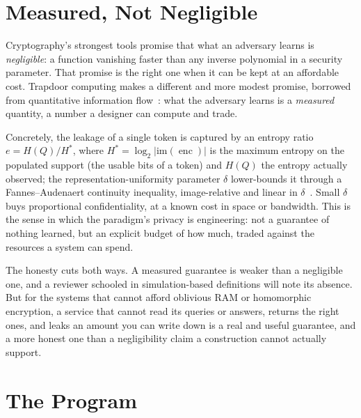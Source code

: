 \documentclass[11pt]{article}
\newcommand{\enc}{\operatorname{enc}}
\begin{document}
\section{Measured, Not Negligible}
\label{sec:measured}

Cryptography's strongest tools promise that what an adversary learns is
\emph{negligible}: a function vanishing faster than any inverse polynomial in a
security parameter. That promise is the right one when it can be kept at an
affordable cost. Trapdoor computing makes a different and more modest promise,
borrowed from quantitative information flow~\cite{smith2009foundations,%
alvim2020science}: what the adversary learns is a \emph{measured} quantity, a
number a designer can compute and trade.

Concretely, the leakage of a single token is captured by an entropy ratio
$e = H(Q)/H^{*}$, where $H^{*} = \log_2|\mathrm{im}(\enc)|$ is the maximum
entropy on the populated support (the usable bits of a token) and $H(Q)$ the
entropy actually observed; the representation-uniformity parameter $\delta$
lower-bounds it through a Fannes--Audenaert continuity inequality, image-relative
and linear in $\delta$~\cite{towell2026maxconf}. Small
$\delta$ buys proportional confidentiality, at a known cost in space or
bandwidth. This is the sense in which the paradigm's privacy is engineering: not
a guarantee of nothing learned, but an explicit budget of how much, traded
against the resources a system can spend.

The honesty cuts both ways. A measured guarantee is weaker than a negligible
one, and a reviewer schooled in simulation-based definitions will note its
absence. But for the systems that cannot afford oblivious RAM or homomorphic
encryption, a service that cannot read its queries or answers, returns the
right ones, and leaks an amount you can write down is a real and useful
guarantee, and a more honest one than a negligibility claim a construction
cannot actually support.

\section{The Program}
\label{sec:program}
\end{document}
